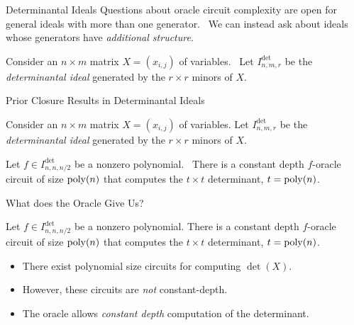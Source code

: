 \documentclass[aspectratio=169]{beamer}
\begin{document}
\begin{frame}{Determinantal Ideals}
    Questions about oracle circuit complexity are open for general ideals with more than one generator.\ \pause
    We can instead ask about ideals whose generators have \emph{additional structure}.

    \pause
    \vspace{10pt}
    
    \begin{ex}
        Consider an $n \times m$ matrix $X = (x_{i, j})$ of variables.\ \pause
        Let $I_{n, m, r}^{\det}$ be the \emph{determinantal ideal} generated by the $r \times r$ minors of $X$.
    \end{ex}
\end{frame}

\begin{frame}{Prior Closure Results in Determinantal Ideals}
    \begin{ex}
        Consider an $n \times m$ matrix $X = (x_{i, j})$ of variables.
        Let $I_{n, m, r}^{\det}$ be the \emph{determinantal ideal} generated by the $r \times r$ minors of $X$.
    \end{ex}

    \pause
    
    \begin{conj}
        Let $f \in I^{\det}_{n, n, n / 2}$ be a nonzero polynomial.\ \pause
        There is a constant depth $f$-oracle circuit of size $\operatorname{poly}(n)$ that computes the $t \times t$ determinant, $t = \operatorname{poly}(n)$.
    \end{conj}
\end{frame}

\begin{frame}{What does the Oracle Give Us?}
    \begin{conj}
        Let $f \in I^{\det}_{n, n, n / 2}$ be a nonzero polynomial.
        There is a constant depth $f$-oracle circuit of size $\operatorname{poly}(n)$ that computes the $t \times t$ determinant, $t = \operatorname{poly}(n)$.
    \end{conj}

    \pause
    \vspace{10pt}

    \begin{itemize}
        \item There exist polynomial size circuits for computing $\det(X)$.\pause
        \item However, these circuits are \emph{not} constant-depth.\pause
        \item The oracle allows \emph{constant depth} computation of the determinant.
    \end{itemize}
\end{frame}
\end{document}
